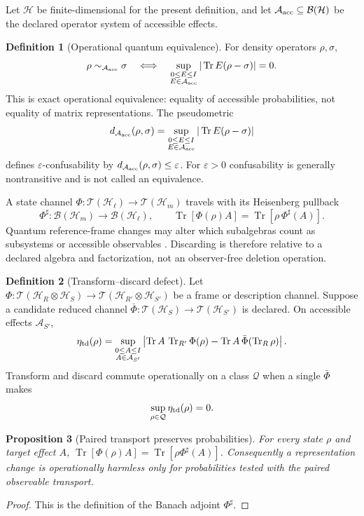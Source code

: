 \documentclass[11pt,a4paper]{article}
\theoremstyle{definition}
\newtheorem{definition}{Definition}[section]
\theoremstyle{plain}
\newtheorem{proposition}[definition]{Proposition}
\theoremstyle{remark}
\newcommand{\E}{\mathbb E}
\newcommand{\Tr}{\operatorname{Tr}}
\begin{document}
Let \(\mathcal H\) be finite-dimensional for the present definition, and let
\(\mathcal A_{\rm acc}\subseteq\mathcal B(\mathcal H)\) be the declared
operator system of accessible effects.

\begin{definition}[Operational quantum equivalence]\label{def:qequiv}
For density operators \(\rho,\sigma\),
\[
\rho\sim_{\mathcal A_{\rm acc}}\sigma
\quad\Longleftrightarrow\quad
\sup_{\substack{0\le E\le I\\E\in\mathcal A_{\rm acc}}}
|\Tr E(\rho-\sigma)|=0 .
\]
This is exact operational equivalence: equality of accessible probabilities,
not equality of matrix representations.  The pseudometric
\[
d_{\mathcal A_{\rm acc}}(\rho,\sigma)
=\sup_{\substack{0\le E\le I\\E\in\mathcal A_{\rm acc}}}
|\Tr E(\rho-\sigma)|
\]
defines \(\varepsilon\)-confusability by
\(d_{\mathcal A_{\rm acc}}(\rho,\sigma)\le\varepsilon\).  For
\(\varepsilon>0\) confusability is generally nontransitive and is not called
an equivalence.
\end{definition}

A state channel \(\Phi:\mathcal T(\mathcal H_\ell)\to
\mathcal T(\mathcal H_m)\) travels with its Heisenberg pullback
\[
\Phi^\sharp:\mathcal B(\mathcal H_m)\to\mathcal B(\mathcal H_\ell),
\qquad
\Tr[\Phi(\rho)A]=\Tr[\rho\,\Phi^\sharp(A)].
\]
Quantum reference-frame changes may alter which subalgebras count as
subsystems or accessible observables \citep{carette2025,ahmad2022,
castroruiz2025}.  Discarding is therefore relative to a declared algebra and
factorization, not an observer-free deletion operation.

\begin{definition}[Transform--discard defect]\label{def:discarddefect}
Let \(\Phi:\mathcal T(\mathcal H_R\otimes\mathcal H_S)\to
\mathcal T(\mathcal H_{R'}\otimes\mathcal H_{S'})\) be a frame or description
channel.  Suppose a candidate reduced channel
\(\bar\Phi:\mathcal T(\mathcal H_S)\to\mathcal T(\mathcal H_{S'})\) is
declared.  On accessible effects \(\mathcal A_{S'}\),
\[
\eta_{\rm td}(\rho)=
\sup_{\substack{0\le A\le I\\A\in\mathcal A_{S'}}}
\left|\Tr A\,\Tr_{R'}\Phi(\rho)
-\Tr A\,\bar\Phi(\Tr_R\rho)\right|.
\]
Transform and discard commute operationally on a class \(\mathcal Q\) when a
single \(\bar\Phi\) makes
\[
\sup_{\rho\in\mathcal Q}\eta_{\rm td}(\rho)=0.
\]
\end{definition}

\begin{proposition}[Paired transport preserves probabilities]\label{prop:paired}
For every state \(\rho\) and target effect \(A\),
\(\Tr[\Phi(\rho)A]=\Tr[\rho\Phi^\sharp(A)]\).  Consequently a representation
change is operationally harmless only for probabilities tested with the
paired observable transport.
\end{proposition}
\begin{proof}
This is the definition of the Banach adjoint \(\Phi^\sharp\).
\end{proof}
\end{document}
